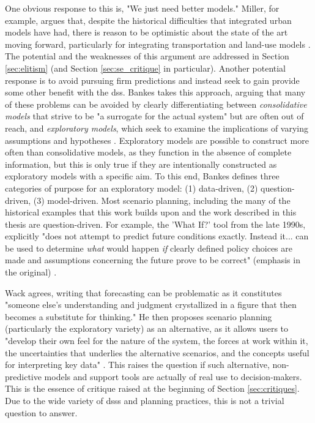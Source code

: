 One obvious response to this is, "We just need better models." Miller, for example, argues that, despite the historical difficulties that integrated urban models have had, there is reason to be optimistic about the state of the art moving forward, particularly for integrating transportation and land-use models \cite{millerIntegratedUrbanModeling2018}. The potential and the weaknesses of this argument are addressed in Section \ref{sec:elitism} (and Section \ref{sec:se_critique} in particular). Another potential response is to avoid pursuing firm predictions and instead seek to gain provide some other benefit with the \ac{dss}. Bankes takes this approach, arguing that many of these problems can be avoided by clearly differentiating between \textit{consolidative models} that strive to be "a surrogate for the actual system" but are often out of reach, and \textit{exploratory models}, which seek to examine the implications of varying assumptions and hypotheses \cite{bankesExploratoryModelingPolicy1993}. Exploratory models are possible to construct more often than consolidative models, as they function in the absence of complete information, but this is only true if they are intentionally constructed as exploratory models with a specific aim.  To this end, Bankes defines three categories of purpose for an exploratory model: (1) data-driven, (2) question-driven, (3) model-driven. Most scenario planning, including the many of the historical examples that this work builds upon and the work described in this thesis are question-driven. For example, the 'What If?' tool from the late 1990s, explicitly "does not attempt to predict future conditions exactly. Instead it... can be used to determine \textit{what} would happen \textit{if} clearly defined policy choices are made and assumptions concerning the future prove to be correct" (emphasis in the original) \cite{klostermanWhatIfCollaborative1999}.

Wack agrees, writing that forecasting can be problematic as it constitutes "someone else's understanding and judgment crystallized in a figure that then becomes a substitute for thinking." He then proposes scenario planning (particularly the exploratory variety) as an alternative, as it allows users to "develop their own feel for the nature of the system, the forces at work within it, the uncertainties that underlies the alternative scenarios, and the concepts useful for interpreting key data" \cite{wackScenariosShootingRapids1985}. This raises the question if such alternative, non-predictive models and support tools are actually of real use to decision-makers. This is the essence of critique raised at the beginning of Section \ref{sec:critiques}. Due to the wide variety of \acp{dss} and planning practices, this is not a trivial question to answer.

